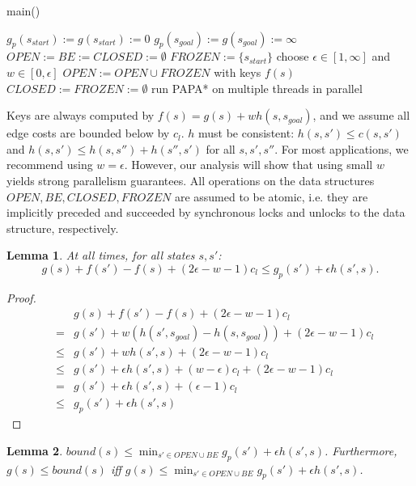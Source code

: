 \documentclass[letterpaper]{article}
\newtheorem{lemma}{Lemma}
\begin{document}
\begin{algorithm}
\caption{main()}
\label{alg:main}
\begin{algorithmic}
\STATE $g_p(s_{start}) := g(s_{start}) := 0$
\STATE $g_p(s_{goal}) := g(s_{goal}) := \infty$
\STATE $OPEN := BE := CLOSED := \emptyset$
\STATE $FROZEN := \{s_{start}\}$
\REPEAT
\STATE choose $\epsilon \in [1,\infty]$ and $w \in [0,\epsilon]$
\STATE $OPEN := OPEN \cup FROZEN$ with keys $f(s)$
\STATE $CLOSED := FROZEN := \emptyset$
\STATE run PAPA* on multiple threads in parallel
\end{algorithmic}
\end{algorithm}

Keys are always computed by $f(s) = g(s) + wh(s,s_{goal})$, and we assume all edge costs are bounded below by $c_l$. $h$ must be consistent: $h(s,s') \le c(s,s')$ and $h(s,s') \le h(s,s'')+h(s'',s')$ for all $s,s',s''$. For most applications, we recommend using $w = \epsilon$. However, our analysis will show that using small $w$ yields strong parallelism guarantees. All operations on the data structures $OPEN,BE,CLOSED,FROZEN$ are assumed to be atomic, i.e. they are implicitly preceded and succeeded by synchronous locks and unlocks to the data structure, respectively.

\begin{lemma}
\label{lem:indep}
At all times, for all states $s,s'$:
\[g(s) + f(s') - f(s) + (2\epsilon-w-1) c_l \le g_p(s') + \epsilon h(s',s).\]
\end{lemma}

\begin{proof}
\begin{eqnarray*}
&&g(s) + f(s') - f(s) + (2\epsilon-w-1) c_l
\\&=& g(s') + w(h(s',s_{goal}) - h(s,s_{goal})) + (2\epsilon-w-1) c_l
\\&\le& g(s') + wh(s',s) + (2\epsilon-w-1) c_l
\\&\le& g(s') + \epsilon h(s',s) + (w-\epsilon) c_l + (2\epsilon-w-1) c_l
\\&=& g(s') + \epsilon h(s',s) + (\epsilon-1) c_l
\\&\le& g_p(s') + \epsilon h(s',s)
\end{eqnarray*}
\end{proof}

\begin{lemma}
\label{lem:bound}
$bound(s) \le \min_{s'\in OPEN \cup BE} g_p(s') + \epsilon h(s',s)$. Furthermore, $g(s) \le bound(s)$ iff $g(s) \le \min_{s'\in OPEN \cup BE} g_p(s') + \epsilon h(s',s)$.
\end{lemma}
\end{document}
